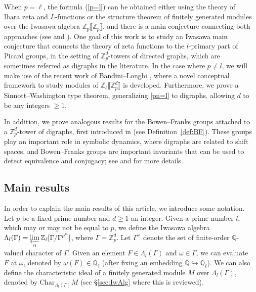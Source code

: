 \documentclass[11pt]{amsart}
\numberwithin{equation}{section}
\theoremstyle{remark}
\newcommand{\?}{\stackrel{?}{=}}
\newcommand{\QQ}{\mathbb{Q}}
\newcommand{\ZZ}{\mathbb{Z}}
\newcommand{\Zp}{\mathbb{Z}_p}
\newcommand{\Q}{\mathbb{Q}}
\newcommand{\Char}{\mathrm{Char}}
\newcommand{\Zl}{\ZZ_\ell}
\newcommand{\Ql}{\QQ_\ell}
\begin{document}
When $p=\ell$, the formula (\ref{p=l}) can be obtained either using the theory of Ihara zeta and $L$-functions or the structure theorem of finitely generated modules over the Iwasawa algebra $\mathbb{Z}_{p}\llbracket \mathbb{Z}_{p}\rrbracket$, and there is a main conjecture connecting both approaches (see \cite[Theorem 6.1]{kataoka} and \cite[Theorem 5.2 and Remark 5.3]{KM1}). One goal of this work is to study an Iwasawa main conjecture that connects the theory of zeta functions to the $l$-primary part of Picard groups, in the setting of $\Zp^d$-towers of directed graphs, which are sometimes referred as digraphs in the literature. In the case where $p\ne l$, we will make use of the recent work of Bandini--Longhi \cite{BandiniLonghi}, where a novel conceptual framework to study modules of $\mathbb{Z}_{\ell}\llbracket \mathbb{Z}_{p}^d \rrbracket$ is developed. Furthermore, we prove a Sinnott--Washington type theorem, generalizing \eqref{pn=l} to digraphs, allowing $d$ to be any integers $\ge1$.

In addition, we prove analogous results for the Bowen--Franks groups attached to a $\Zp^d$-tower of digraphs, first introduced in \cite{BF} (see Definition~\ref{def:BF}). These groups play an important role in symbolic dynamics, where digraphs are related to shift spaces, and Bowen--Franks groups are important invariants that can be used to detect equivalence and conjugacy; see \cite{franks} and \cite{lindmarcus} for more details. 

\subsection{Main results}
In order to explain the main results of this article, we introduce some notation. Let $p$ be a fixed prime number and $d\ge1$ an integer. Given a prime number $l$, which may or may not be equal to $p$, we define the Iwasawa algebra $\Lambda_l(\Gamma)=\displaystyle\varprojlim_n\Zl[\Gamma/\Gamma^{p^n}]$, where $\Gamma=\Zp^d$. Let $\Gamma^\vee$ denote the set of finite-order $\overline{\Q}$-valued character of $\Gamma$. Given an element $F\in\Lambda_l(\Gamma)$ and $\omega\in\Gamma$, we can evaluate $F$ at $\omega$, denoted by $\omega(F)\in\overline{\Ql} $ (after fixing an embedding $\overline{\QQ}\hookrightarrow\overline{\Ql}$). We can also define the characteristic ideal of a finitely generated module $M$ over $\Lambda_l(\Gamma)$, denoted by $\Char_{\Lambda_l(\Gamma)}M$ (see \S\ref{sec:IwAlg} where this is reviewed). 
\end{document}

